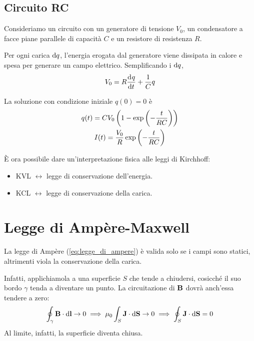 \subsection{Circuito RC}

Consideriamo un circuito con
un generatore di tensione $V_0$,
un condensatore a facce piane parallele di capacità $C$
e un resistore di resistenza $R$.

Per ogni carica $\mathrm{d} q$, l'energia erogata dal generatore viene dissipata in calore e spesa per generare un campo elettrico.
Semplificando i $\mathrm{d} q$,
\begin{equation}
    V_0 = R \der[q]{t} + \frac{1}{C} q
\end{equation}

La soluzione con condizione iniziale $q(0) = 0$ è
\begin{subequations}
\begin{gather}
    q(t) = C V_0 \left( 1 - \operatorname{exp}\left( -\frac{t}{RC} \right) \right) \\
    I(t) = \frac{V_0}{R} \operatorname{exp}\left( -\frac{t}{RC} \right)
\end{gather}
\end{subequations}

È ora possibile dare un'interpretazione fisica alle leggi di Kirchhoff:
\begin{itemize}
    \item KVL $\longleftrightarrow$ legge di conservazione dell'energia.
    \item KCL $\longleftrightarrow$ legge di conservazione della carica.
\end{itemize}

\section{Legge di Ampère-Maxwell}
\label{sec:ampere_maxwell}


La legge di Ampère (\cref{eq:legge_di_ampere}) è valida solo se i campi sono statici, altrimenti viola la conservazione della carica.

Infatti, applichiamola a una superficie $S$ che tende a chiudersi, cosicché il suo bordo $\gamma$ tenda a diventare un punto.
La circuitazione di $\mathbf{B}$ dovrà anch'essa tendere a zero:
\begin{gather}
    \oint_\gamma \mathbf{B} \cdot \mathrm{d} \mathbf{l} \to 0
    \implies \mu_0 \int_S \mathbf{J} \cdot \mathrm{d} \mathbf{S} \to 0
    \implies \oint_S \mathbf{J} \cdot \mathrm{d} \mathbf{S} = 0
\end{gather}
Al limite, infatti, la superficie diventa chiusa.

